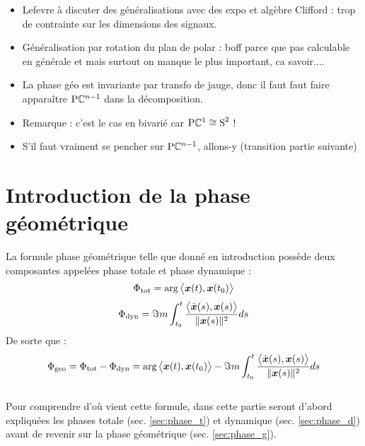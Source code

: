 \begin{enumerate}[label=\arabic* --- ]
\begin{enumerate}[label=\arabic{enumi}.\arabic* --- ]
\begin{itemize}
			\item Lefevre à discuter des généralisations \cite[sec. I.3]{lefevre_polarization_2021} avec des expo et algèbre Clifford : trop de contrainte sur les dimensions des signaux.
			
			\item Généralisation par rotation du plan de polar : boff parce que pas calculable en générale et mais surtout on manque le plus important, ca savoir.... 
			
			\item La phase géo est invariante par transfo de jauge, donc il faut faut faire apparaître $\text{\normalfont P}\mathbb{C}^{n-1}$ dans la décomposition.
			
			\item Remarque : c'est le cas en bivarié car $\text{\normalfont P}\mathbb{C}^{1}\cong \text{\normalfont S}^{2}$ !
			
			\item S'il faut vraiment se pencher sur $\text{\normalfont P}\mathbb{C}^{n-1}$, allons-y (transition partie suivante)
			
		\end{itemize}
	\end{enumerate}
\end{enumerate}

\newpage





\section{Introduction de la phase géométrique} \label{sec:AM-FM-PM}

La formule phase géométrique telle que donné en introduction possède deux composantes appelées phase totale et phase dynamique :
\begin{equation}\label{eq:phase_t}
	\Phi_{\text{\normalfont tot}} = \arg\big\langle \boldsymbol{x}(t), \boldsymbol{x}(t_0)\big\rangle
\end{equation}
\begin{equation}\label{eq:phase_d}
	\Phi_{\text{\normalfont dyn}} = \Im m\int_{t_0}^t \frac{\big\langle \dot{\boldsymbol{x}}(s) , \boldsymbol{x}(s) \big\rangle}{\|\boldsymbol{x}(s)\|^2} ds
\end{equation}
De sorte que :
\begin{equation}\label{eq:phase_g}
	\Phi_{\text{\normalfont geo}} = \Phi_{\text{\normalfont tot}} - \Phi_{\text{\normalfont dyn}} = \arg\big\langle \boldsymbol{x}(t), \boldsymbol{x}(t_0)\big\rangle - \Im m\int_{t_0}^t \frac{\big\langle \dot{\boldsymbol{x}}(s) , \boldsymbol{x}(s) \big\rangle}{\|\boldsymbol{x}(s)\|^2} ds
\end{equation}
\\
Pour comprendre d'où vient cette formule, dans cette partie seront d'abord expliquées les phases totale (sec. \ref{sec:phase_t}) et dynamique (sec. \ref{sec:phase_d}) avant de revenir sur la phase géométrique (sec. \ref{sec:phase_g}).



